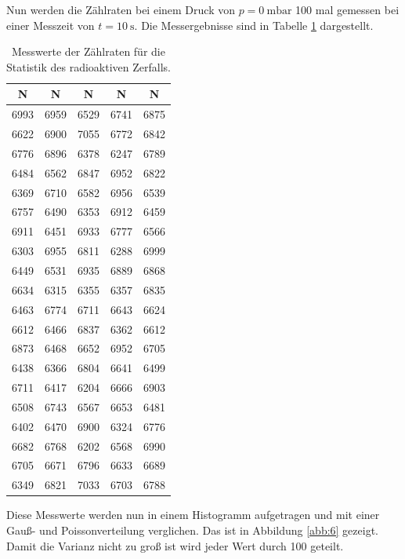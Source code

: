 Nun werden die Zählraten bei einem Druck von $p = \SI{0}{\milli\bar}$ 100 mal gemessen
bei einer Messzeit von $t = \SI{10}{\second}$. Die Messergebnisse sind in Tabelle \ref{tab:3}
dargestellt.

\begin{table}[H]
  \centering
  \caption{Messwerte der Zählraten für die Statistik des radioaktiven Zerfalls.}
  \label{tab:3}
  \begin{tabular}{c c c c c}
    \toprule
    N & N & N & N & N \\
    \midrule
    6993 & 6959 & 6529 & 6741 & 6875 \\
    6622 & 6900 & 7055 & 6772 & 6842 \\
    6776 & 6896 & 6378 & 6247 & 6789 \\
    6484 & 6562 & 6847 & 6952 & 6822 \\
    6369 & 6710 & 6582 & 6956 & 6539 \\
    6757 & 6490 & 6353 & 6912 & 6459 \\
    6911 & 6451 & 6933 & 6777 & 6566 \\
    6303 & 6955 & 6811 & 6288 & 6999 \\
    6449 & 6531 & 6935 & 6889 & 6868 \\
    6634 & 6315 & 6355 & 6357 & 6835 \\
    6463 & 6774 & 6711 & 6643 & 6624 \\
    6612 & 6466 & 6837 & 6362 & 6612 \\
    6873 & 6468 & 6652 & 6952 & 6705 \\
    6438 & 6366 & 6804 & 6641 & 6499 \\
    6711 & 6417 & 6204 & 6666 & 6903 \\
    6508 & 6743 & 6567 & 6653 & 6481 \\
    6402 & 6470 & 6900 & 6324 & 6776 \\
    6682 & 6768 & 6202 & 6568 & 6990 \\
    6705 & 6671 & 6796 & 6633 & 6689 \\
    6349 & 6821 & 7033 & 6703 & 6788 \\
    \bottomrule
  \end{tabular}
\end{table}

Diese Messwerte werden nun in einem Histogramm aufgetragen und mit einer Gauß- und
Poissonverteilung verglichen. Das ist in Abbildung \ref{abb:6} gezeigt.
Damit die Varianz nicht zu groß ist wird jeder Wert durch 100 geteilt.

